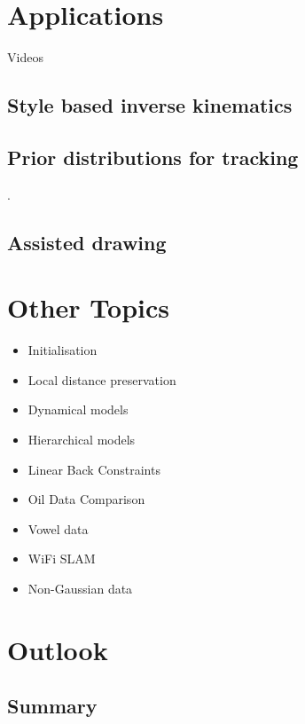 \chapter{Applications}

Videos


\section{Style based inverse kinematics }

\cite{Grochow:styleik04}


\section{Prior distributions for tracking }

\cite{Urtasun:3dpeople06,Urtasun:priors05}.


\section{Assisted drawing}

\cite{Baxter:doodle06}


\chapter{Other Topics}
\begin{itemize}
\item Initialisation 
\item Local distance preservation 
\item Dynamical models 
\item Hierarchical models 
\item Linear Back Constraints 
\item Oil Data Comparison 
\item Vowel data 
\item WiFi SLAM 
\item Non-Gaussian data 
\end{itemize}

\chapter{Outlook}


\section{Summary}

